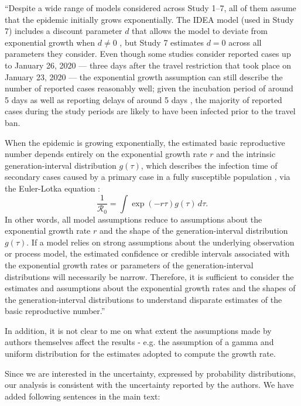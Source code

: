\documentclass[12pt]{article}
\newcommand{\Ro}{\ensuremath{{\mathcal R}_{0}}\xspace}
\newcommand{\revtext}{\textsf}
\begin{document}
``Despite a wide range of models considered across Study 1--7, all of them assume that the epidemic initially grows exponentially.
The IDEA model (used in Study 7) includes a discount parameter $d$ that allows the model to deviate from exponential growth when $d \neq 0$ \citep{fisman2013idea}, but Study 7 estimates $d=0$ across all parameters they consider.
Even though some studies consider reported cases up to January 26, 2020 --- three days after the travel restriction that took place on January 23, 2020 \citep{Tianeabb6105} --- the exponential growth assumption can still describe the number of reported cases reasonably well;
given the incubation period of around 5 days \citep{lauer2020incubation} as well as reporting delays of around 5 days \citep{sun2020early}, the majority of reported cases during the study periods are likely to have been infected prior to the travel ban.

When the epidemic is growing exponentially, the estimated basic reproductive number depends entirely on the exponential growth rate $r$ and the intrinsic generation-interval distribution $g(\tau)$, which describes the infection time of secondary cases caused by a primary case in a fully susceptible population \citep{champredon2015intrinsic}, via the Euler-Lotka equation \citep{wallinga2007generation}:
\begin{equation}
\frac{1}{\Ro} = \int \exp(-r\tau) g(\tau) \, d\tau.
\label{eq:euler}
\end{equation}
In other words, all model assumptions reduce to assumptions about the exponential growth rate $r$ and the shape of the generation-interval distribution $g(\tau)$.
If a model relies on strong assumptions about the underlying observation or process model, the estimated confidence or credible intervals associated with the exponential growth rates or parameters of the generation-interval distributions will necessarily be narrow.
Therefore, it is sufficient to consider the estimates and assumptions about the exponential growth rates and the shapes of the generation-interval distributions to understand disparate estimates of the basic reproductive number.''

\revtext{In addition, it is not clear to me on what extent the assumptions made by authors themselves affect the results - e.g. the assumption of a gamma and uniform distribution for the estimates adopted to compute the growth rate.}

Since we are interested in the uncertainty, expressed by probability distributions, our analysis is consistent with the uncertainty reported by the authors. We have added following sentences in the main text:
\end{document}
